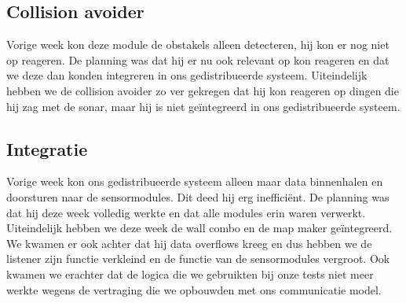 \documentclass[a4paper,10pt]{article}
\begin{document}
\subsection{Collision avoider}
Vorige week kon deze module de obstakels alleen detecteren, hij kon er nog niet op reageren. De planning was dat hij er nu ook relevant op kon reageren en dat we deze dan konden integreren in ons gedistribueerde systeem. Uiteindelijk hebben we de collision avoider zo ver gekregen dat hij kon reageren op dingen die hij zag met de sonar, maar hij is niet ge\"{i}ntegreerd in ons gedistribueerde systeem.

\newpage

\subsection{Integratie}
Vorige week kon ons gedistribueerde systeem alleen maar data binnenhalen en doorsturen naar de sensormodules. Dit deed hij erg ineffici\"{e}nt. De planning was dat hij deze week volledig werkte en dat alle modules erin waren verwerkt. Uiteindelijk hebben we deze week de wall combo en de map maker ge\"{i}ntegreerd. We kwamen er ook achter dat hij data overflows kreeg en dus hebben we de listener zijn functie verkleind en de functie van de sensormodules vergroot. Ook kwamen we erachter dat de logica die we gebruikten bij onze tests niet meer werkte wegens de vertraging die we opbouwden met ons communicatie model.
\end{document}
